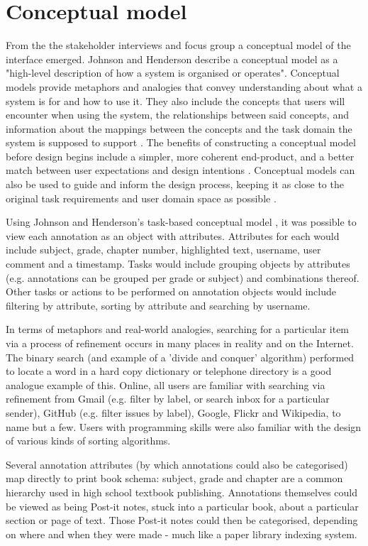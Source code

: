 \section{Conceptual model}
From the the stakeholder interviews and focus group a conceptual model of the interface emerged. Johnson and Henderson \citep[p. 27]{Johnson} describe a conceptual model as a "high-level description of how a system is organised or operates". Conceptual models provide metaphors and analogies that convey understanding about what a system is for and how to use it. They also include the concepts that users will encounter when using the system, the relationships between said concepts, and information about the mappings between the concepts and the task domain the system is supposed to support \citep[p. 40-41]{RogersPreece}.  The benefits of constructing a conceptual model before design begins include a simpler, more coherent end-product, and a better match between user expectations and design intentions \citep[p. 26]{Johnson}. Conceptual models can also be used to guide and inform the design process, keeping it as close to the original task requirements and user domain space as possible \citep[p. 40]{RogersPreece}. 

Using Johnson and Henderson's task-based conceptual model \citep[p. 30]{Johnson}, it was possible to view each annotation as an object with attributes. Attributes for each would include subject, grade, chapter number, highlighted text, username, user comment and a timestamp. Tasks would include grouping objects by attributes (e.g. annotations can be grouped per grade or subject) and combinations thereof. Other tasks or actions to be performed on annotation objects would include filtering by attribute, sorting by attribute and searching by username. 

In terms of metaphors and real-world analogies, searching for a particular item via a process of refinement occurs in many places in reality and on the Internet. The binary search (and example of a 'divide and conquer' algorithm) \citep[p. 48]{Neapolitan} performed to locate a word in a hard copy dictionary or telephone directory is a good analogue example of this. Online, all users are familiar with searching via refinement from Gmail (e.g. filter by label, or search inbox for a particular sender), GitHub (e.g. filter issues by label), Google, Flickr and Wikipedia, to name but a few. Users with programming skills were also familiar with the design of various kinds of sorting algorithms. 

Several annotation attributes (by which annotations could also be categorised) map directly to print book schema: subject, grade and chapter are a common hierarchy used in high school textbook publishing. Annotations themselves could be viewed as being Post-it notes, stuck into a particular book, about a particular section or page of text. Those Post-it notes could then be categorised, depending on where and when they were made - much like a paper library indexing system. 

